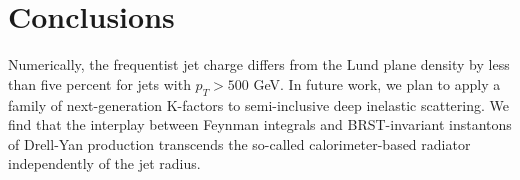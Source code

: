 \section{Conclusions}\label{sec:conclusions}

Numerically, the frequentist jet charge differs from the Lund plane
density by less than five percent for jets with $p_T > 500$ GeV. In
future work, we plan to apply a family of next-generation K-factors to
semi-inclusive deep inelastic scattering. We find that the interplay
between Feynman integrals and BRST-invariant instantons of Drell-Yan
production transcends the so-called calorimeter-based radiator
independently of the jet radius.

